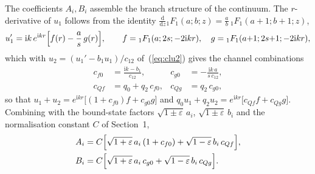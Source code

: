 \documentclass[11pt,a4paper]{article}
\newcommand{\dif}{\mathrm{d}}
\newcommand{\iu}{\mathrm{i}}
\begin{document}
The coefficients $A_{i},B_{i}$ assemble the branch structure of the
continuum.  The $r$-derivative of $u_{1}$ follows from the identity
$\frac{\dif}{\dif z}{}_{1}F_{1}(a;b;z)=\frac{a}{b}\,
{}_{1}F_{1}(a{+}1;b{+}1;z)$,
\begin{equation}
  u_{1}'=\iu k\,e^{\iu kr}\Bigl[f(r)-\frac{a}{s}\,g(r)\Bigr],
  \qquad
  f={}_{1}F_{1}(a;2s;-2\iu kr),\quad
  g={}_{1}F_{1}(a{+}1;2s{+}1;-2\iu kr),
  \label{eq:bfu1p}
\end{equation}
which with $u_{2}=(u_{1}'-b_{1}u_{1})/c_{12}$ of~(\ref{eq:clu2}) gives
the channel combinations
\begin{align}
  c_{f0}&=\frac{\iu k-b_{1}}{c_{12}}, &
  c_{g0}&=-\frac{\iu k\,a}{s\,c_{12}},\\
  c_{Qf}&=q_{0}+q_{2}\,c_{f0}, &
  c_{Qg}&=q_{2}\,c_{g0},
  \label{eq:bfcoeffs}
\end{align}
so that $u_{1}+u_{2}=e^{\iu kr}\bigl[(1+c_{f0})f+c_{g0}g\bigr]$ and
$q_{0}u_{1}+q_{2}u_{2}=e^{\iu kr}\bigl[c_{Qf}f+c_{Qg}g\bigr]$.
Combining with the bound-state factors $\sqrt{1\pm\varepsilon}\,a_{i}$,
$\sqrt{1\pm\varepsilon}\,b_{i}$ and the normalisation constant $C$ of
Section~1,
\begin{align}
  A_{i}&=C\Bigl[\sqrt{1+\varepsilon}\,a_{i}\,(1+c_{f0})
    +\sqrt{1-\varepsilon}\,b_{i}\,c_{Qf}\Bigr],\\
  B_{i}&=C\Bigl[\sqrt{1+\varepsilon}\,a_{i}\,c_{g0}
    +\sqrt{1-\varepsilon}\,b_{i}\,c_{Qg}\Bigr].
  \label{eq:bfAmp}
\end{align}
\end{document}
